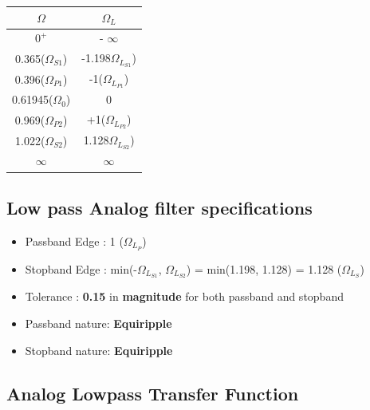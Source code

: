 \documentclass{article}
\begin{document}
\begin{table}[H]
		\begin{center}
		\begin{tabular}{|c|c|}
			\hline
			$\Omega$ & $\Omega_L$\\
			
			\hline
                $0^+$ & - $\infty$\\
                \hline
                0.365($\Omega_{S1}$) & -1.198$\Omega_{L_{S1}}$)\\
                \hline
                0.396($\Omega_{P1}$) & -1($\Omega_{L_{P1}}$)\\
                \hline
                0.61945($\Omega_0$) & 0\\
                \hline
                0.969($\Omega_{P2}$) & +1($\Omega_{L_{P2}}$) \\
                \hline
                1.022($\Omega_{S2}$) & 1.128$\Omega_{L_{S2}}$)\\
                \hline
                $\infty$ & $\infty$\\
                \hline
            
		\end{tabular}
		\end{center}
\end{table}

\subsection{Low pass Analog filter specifications}

\begin{itemize}
    \item Passband Edge : 1 ($\Omega_{L_{P}}$)
    \item Stopband Edge : min(-$\Omega_{L_{S1}}$, $\Omega_{L_{S2}}$) = min(1.198, 1.128) = 1.128 ($\Omega_{L_{S}}$)
    \item  Tolerance : \textbf{0.15} in \textbf{magnitude} for both passband and stopband
    \item Passband nature: \textbf{Equiripple}
    \item Stopband nature: \textbf{Equiripple}
\end{itemize}

\subsection{Analog Lowpass Transfer Function}
\end{document}
